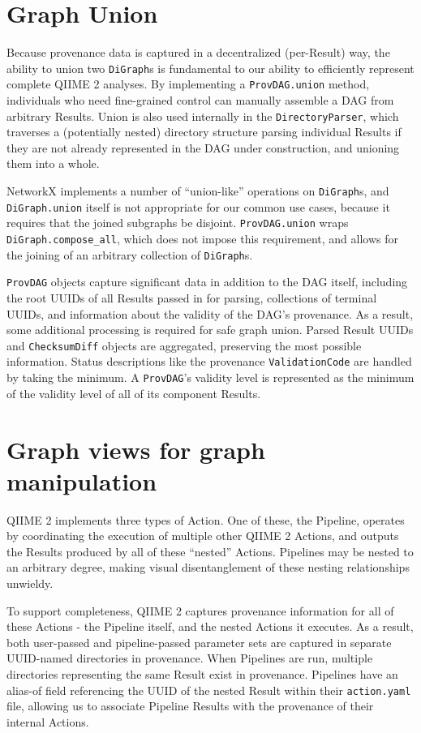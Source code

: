 \section{Graph Union}

Because provenance data is captured in a decentralized (per-Result) way, the
ability to union two \texttt{DiGraph}s is fundamental to our ability to efficiently
represent complete QIIME 2 analyses. By implementing a \texttt{ProvDAG.union} method,
individuals who need fine-grained control can manually assemble a DAG from
arbitrary Results. Union is also used internally in the \texttt{DirectoryParser}, which
traverses a (potentially nested) directory structure parsing individual Results
if they are not already represented in the DAG under construction, and unioning
them into a whole.

NetworkX implements a number of “union-like” operations on \texttt{DiGraph}s, and
\texttt{DiGraph.union} itself is not appropriate for our common use cases, because it
requires that the joined subgraphs be disjoint. \texttt{ProvDAG.union} wraps
\texttt{DiGraph.compose\_all}, which does not impose this requirement, and allows for the
joining of an arbitrary collection of \texttt{DiGraph}s.

\texttt{ProvDAG} objects capture significant data in addition to the DAG itself,
including the root UUIDs of all Results passed in for parsing, collections of
terminal UUIDs, and information about the validity of the DAG’s provenance. As a
result, some additional processing is required for safe graph union. Parsed
Result UUIDs and \texttt{ChecksumDiff} objects are aggregated, preserving the most
possible information. Status descriptions like the provenance \texttt{ValidationCode} are
handled by taking the minimum. A \texttt{ProvDAG}'s validity level is represented as the
minimum of the validity level of all of its component Results.


\section{Graph views for graph manipulation}

QIIME 2 implements three types of Action. One of these, the Pipeline, operates
by coordinating the execution of multiple other QIIME 2 Actions, and outputs the
Results produced by all of these “nested” Actions. Pipelines may be nested to an
arbitrary degree, making visual disentanglement of these nesting relationships
unwieldy.

To support completeness, QIIME 2 captures provenance information for all of
these Actions - the Pipeline itself, and the nested Actions it executes. As a
result, both user-passed and pipeline-passed parameter sets are captured in
separate UUID-named directories in provenance. When Pipelines are run, multiple
directories representing the same Result exist in provenance. Pipelines have an
alias-of field referencing the UUID of the nested Result within their
\texttt{action.yaml} file, allowing us to associate Pipeline Results with the provenance
of their internal Actions. 

